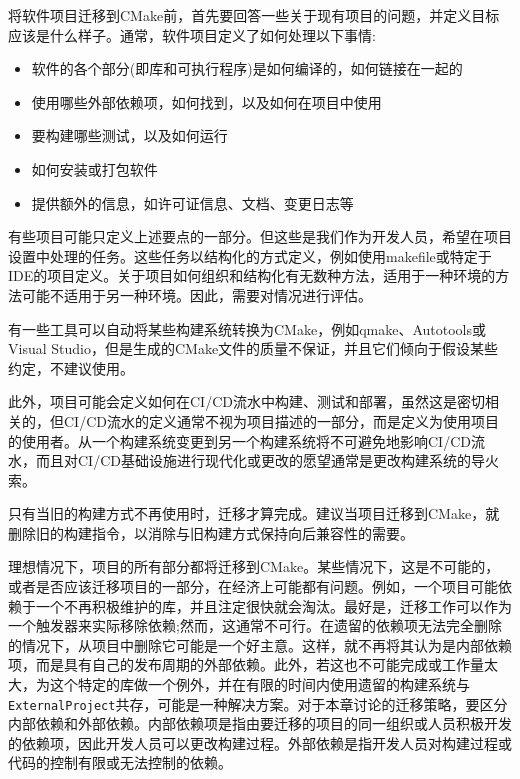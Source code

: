 将软件项目迁移到CMake前，首先要回答一些关于现有项目的问题，并定义目标应该是什么样子。通常，软件项目定义了如何处理以下事情:

\begin{itemize}
\item 
软件的各个部分(即库和可执行程序)是如何编译的，如何链接在一起的

\item 
使用哪些外部依赖项，如何找到，以及如何在项目中使用

\item 
要构建哪些测试，以及如何运行

\item 
如何安装或打包软件

\item 
提供额外的信息，如许可证信息、文档、变更日志等
\end{itemize}

有些项目可能只定义上述要点的一部分。但这些是我们作为开发人员，希望在项目设置中处理的任务。这些任务以结构化的方式定义，例如使用makefile或特定于IDE的项目定义。关于项目如何组织和结构化有无数种方法，适用于一种环境的方法可能不适用于另一种环境。因此，需要对情况进行评估。

有一些工具可以自动将某些构建系统转换为CMake，例如qmake、Autotools或Visual Studio，但是生成的CMake文件的质量不保证，并且它们倾向于假设某些约定，不建议使用。

此外，项目可能会定义如何在CI/CD流水中构建、测试和部署，虽然这是密切相关的，但CI/CD流水的定义通常不视为项目描述的一部分，而是定义为使用项目的使用者。从一个构建系统变更到另一个构建系统将不可避免地影响CI/CD流水，而且对CI/CD基础设施进行现代化或更改的愿望通常是更改构建系统的导火索。

只有当旧的构建方式不再使用时，迁移才算完成。建议当项目迁移到CMake，就删除旧的构建指令，以消除与旧构建方式保持向后兼容性的需要。

理想情况下，项目的所有部分都将迁移到CMake。某些情况下，这是不可能的，或者是否应该迁移项目的一部分，在经济上可能都有问题。例如，一个项目可能依赖于一个不再积极维护的库，并且注定很快就会淘汰。最好是，迁移工作可以作为一个触发器来实际移除依赖;然而，这通常不可行。在遗留的依赖项无法完全删除的情况下，从项目中删除它可能是一个好主意。这样，就不再将其认为是内部依赖项，而是具有自己的发布周期的外部依赖。此外，若这也不可能完成或工作量太大，为这个特定的库做一个例外，并在有限的时间内使用遗留的构建系统与\texttt{ExternalProject}共存，可能是一种解决方案。对于本章讨论的迁移策略，要区分内部依赖和外部依赖。内部依赖项是指由要迁移的项目的同一组织或人员积极开发的依赖项，因此开发人员可以更改构建过程。外部依赖是指开发人员对构建过程或代码的控制有限或无法控制的依赖。

